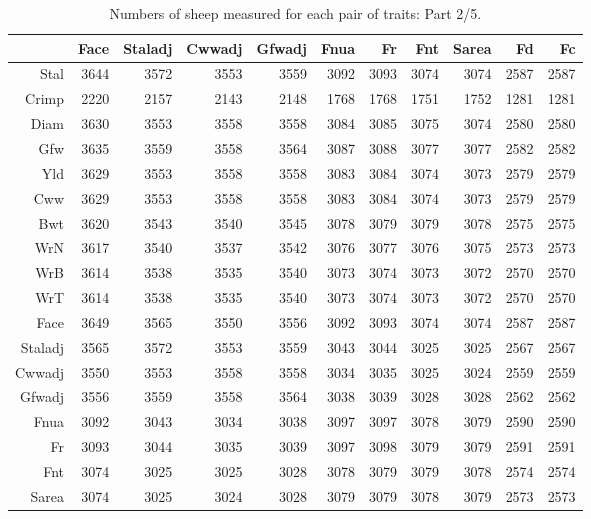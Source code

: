 \begin{table}[p]
\footnotesize
\centering
\caption{Numbers of sheep measured for each pair of traits: Part 2/5.} 
\label{tab:counts2}
\begin{tabular}{rrrrrrrrrrr}
  \hline
 & Face & Staladj & Cwwadj & Gfwadj & Fnua & Fr & Fnt & Sarea & Fd & Fc \\ 
  \hline
Stal & 3644 & 3572 & 3553 & 3559 & 3092 & 3093 & 3074 & 3074 & 2587 & 2587 \\ 
  Crimp & 2220 & 2157 & 2143 & 2148 & 1768 & 1768 & 1751 & 1752 & 1281 & 1281 \\ 
  Diam & 3630 & 3553 & 3558 & 3558 & 3084 & 3085 & 3075 & 3074 & 2580 & 2580 \\ 
  Gfw & 3635 & 3559 & 3558 & 3564 & 3087 & 3088 & 3077 & 3077 & 2582 & 2582 \\ 
  Yld & 3629 & 3553 & 3558 & 3558 & 3083 & 3084 & 3074 & 3073 & 2579 & 2579 \\ 
  Cww & 3629 & 3553 & 3558 & 3558 & 3083 & 3084 & 3074 & 3073 & 2579 & 2579 \\ 
  Bwt & 3620 & 3543 & 3540 & 3545 & 3078 & 3079 & 3079 & 3078 & 2575 & 2575 \\ 
  WrN & 3617 & 3540 & 3537 & 3542 & 3076 & 3077 & 3076 & 3075 & 2573 & 2573 \\ 
  WrB & 3614 & 3538 & 3535 & 3540 & 3073 & 3074 & 3073 & 3072 & 2570 & 2570 \\ 
  WrT & 3614 & 3538 & 3535 & 3540 & 3073 & 3074 & 3073 & 3072 & 2570 & 2570 \\ 
  Face & 3649 & 3565 & 3550 & 3556 & 3092 & 3093 & 3074 & 3074 & 2587 & 2587 \\ 
  Staladj & 3565 & 3572 & 3553 & 3559 & 3043 & 3044 & 3025 & 3025 & 2567 & 2567 \\ 
  Cwwadj & 3550 & 3553 & 3558 & 3558 & 3034 & 3035 & 3025 & 3024 & 2559 & 2559 \\ 
  Gfwadj & 3556 & 3559 & 3558 & 3564 & 3038 & 3039 & 3028 & 3028 & 2562 & 2562 \\ 
  Fnua & 3092 & 3043 & 3034 & 3038 & 3097 & 3097 & 3078 & 3079 & 2590 & 2590 \\ 
  Fr & 3093 & 3044 & 3035 & 3039 & 3097 & 3098 & 3079 & 3079 & 2591 & 2591 \\ 
  Fnt & 3074 & 3025 & 3025 & 3028 & 3078 & 3079 & 3079 & 3078 & 2574 & 2574 \\ 
  Sarea & 3074 & 3025 & 3024 & 3028 & 3079 & 3079 & 3078 & 3079 & 2573 & 2573 \\ 

\end{tabular}
\end{table}

